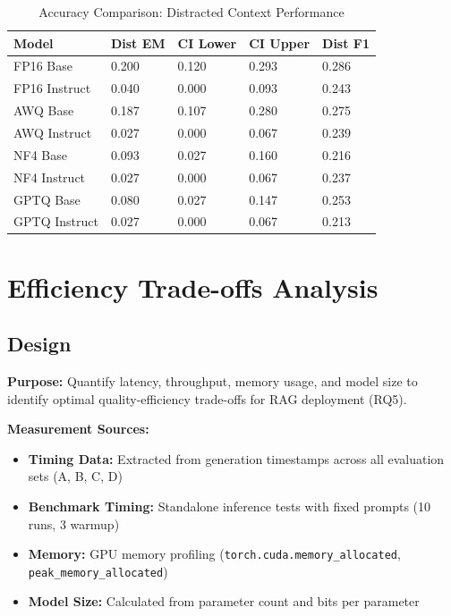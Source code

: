 \documentclass[11pt,a4paper]{article}
\begin{document}
\begin{table}[H]
\centering
\caption{Accuracy Comparison: Distracted Context Performance}
\small
\begin{tabularx}{\textwidth}{@{}X C{1.8cm} C{1.8cm} C{1.8cm} C{1.8cm}@{}}
\toprule
\textbf{Model} & \textbf{Dist EM} & \textbf{CI Lower} & \textbf{CI Upper} & \textbf{Dist F1} \\
\midrule
FP16 Base & 0.200 & 0.120 & 0.293 & 0.286 \\
FP16 Instruct & 0.040 & 0.000 & 0.093 & 0.243 \\
AWQ Base & 0.187 & 0.107 & 0.280 & 0.275 \\
AWQ Instruct & 0.027 & 0.000 & 0.067 & 0.239 \\
NF4 Base & 0.093 & 0.027 & 0.160 & 0.216 \\
NF4 Instruct & 0.027 & 0.000 & 0.067 & 0.237 \\
GPTQ Base & 0.080 & 0.027 & 0.147 & 0.253 \\
GPTQ Instruct & 0.027 & 0.000 & 0.067 & 0.213 \\
\bottomrule
\end{tabularx}
\end{table}

\newpage
\section{Efficiency Trade-offs Analysis}

\subsection{Design}

\textbf{Purpose:} Quantify latency, throughput, memory usage, and model size to identify optimal quality-efficiency trade-offs for RAG deployment (RQ5).

\textbf{Measurement Sources:}
\begin{itemize}
\item \textbf{Timing Data:} Extracted from generation timestamps across all evaluation sets (A, B, C, D)
\item \textbf{Benchmark Timing:} Standalone inference tests with fixed prompts (10 runs, 3 warmup)
\item \textbf{Memory:} GPU memory profiling (\texttt{torch.cuda.memory\_allocated}, \texttt{peak\_memory\_allocated})
\item \textbf{Model Size:} Calculated from parameter count and bits per parameter
\end{itemize}
\end{document}
